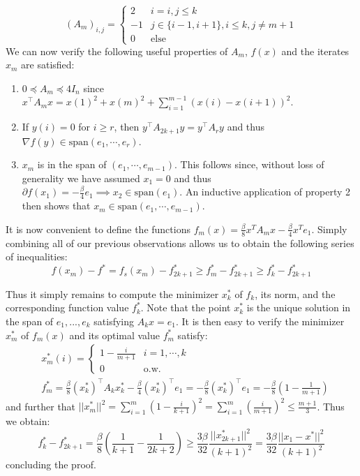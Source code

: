 \begin{equation}
(A_m)_{i,j} = \begin{cases}
                2  &  i = i,j \leq k \\
                -1 &  j \in \{i-1, i+1\}, i \leq k, j \neq m+1\\
                0 & \text{else}
            \end{cases}
\end{equation}
 We can now verify the following useful properties of $A_m$, $f(x)$ and the iterates $x_m$ are satisfied:
\begin{enumerate}
\item $0 \preceq A_m \preceq 4I_n$ since $x^\top A_m x = x(1)^2 + x(m)^2 + \sum_{i=1}^{m-1} (x(i)-x(i+1))^2$.
\item If $y(i) = 0$ for $i \geq r$, then $y^\top A_{2k+1} y = y^\top A_{r}y$ and thus $\nabla f(y) \in \text{span}(e_1, \cdots, e_{r})$.  
\item $x_m$ is in the span of $(e_1, \cdots, e_{m-1})$. This follows since, without loss of generality we have assumed $x_1 = 0$ and thus $\partial f(x_1) = -\frac{\beta}{4}e_1 \implies x_2 \in \text{span}(e_1)$. An inductive application of property 2 then shows that $x_m \in \text{span}(e_1, \cdots, e_{m-1})$.
\end{enumerate}

It is now convenient to define the functions $f_m(x) = \frac{\beta}{8} x^T A_m x - \frac{\beta}{4}x^Te_1$. Simply combining all of our previous observations allows us to obtain the following series of inequalities:
\begin{equation}
f(x_m) - f^* = f_s(x_m) - f_{2k+1}^* \geq f_m^* - f^*_{2k+1} \geq f_k^* - f_{2k+1}^*
\end{equation}

Thus it simply remains to compute the minimizer $x_k^*$ of $f_k$, its norm, and the corresponding function value $f_k^*$. Note that the point $x_k^*$ is the unique solution in the span of $e_1, ..., e_k$ satisfying $A_k x = e_1$. It is then easy to verify the minimizer $x_m^*$ of $f_m(x)$ and its optimal value $f_m^*$ satisfy:
    \begin{align}
        & x_m^*(i) = \begin{cases}
                    1-\frac{i}{m+1} & i = 1, \cdots, k \\
                    0 & \text{o.w.}
                    \end{cases}\\
        & f_m^* = \frac{\beta}{8}(x^*_k)^\top A_k x_k^* - \frac{\beta}{4}(x^*_k)^\top e_1 = -\frac{\beta}{8}(x_k^*)^\top e_1 = -\frac{\beta}{8}\left( 1-\frac{1}{m+1}\right)
    \end{align}
and further that $||x_m^*||^2 = \sum_{i=1}^{m}(1-\frac{i}{k+1})^2 = \sum_{i=1}^m \left( \frac{i}{m+1}\right)^2 \leq \frac{m+1}{3}$. Thus we obtain:
\begin{equation}
f_k^* - f_{2k+1}^* =\frac{\beta}{8}\left( \frac{1}{k+1} - \frac{1}{2k+2}\right) \geq \frac{3\beta}{32} \frac{||x_{2k+1}^*||^2}{(k+1)^2} = \frac{3\beta}{32} \frac{||x_1 - x^*||^2}{(k+1)^2}
\end{equation}
concluding the proof.
\proofend


